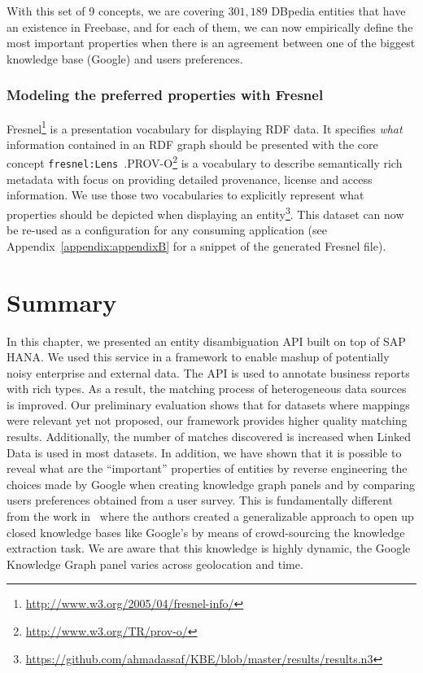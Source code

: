 With this set of 9 concepts, we are covering $301,189$ DBpedia entities that have an existence in Freebase, and for each of them, we can now empirically define the most important properties when there is an agreement between one of the biggest knowledge base (Google) and users preferences.

\subsubsection{Modeling the preferred properties with Fresnel}

Fresnel\footnote{\url{http://www.w3.org/2005/04/fresnel-info/}} is a presentation vocabulary for displaying RDF data. It specifies \textit{what} information contained in an RDF graph should be presented with the core concept \texttt{fresnel:Lens}~\cite{Pietriga:ISWC:06}.PROV-O\footnote{\url{http://www.w3.org/TR/prov-o/}} is a vocabulary to describe semantically rich metadata with focus on providing detailed provenance, license and access information.  We use those two vocabularies to explicitly represent what properties should be depicted when displaying an entity\footnote{\url{https://github.com/ahmadassaf/KBE/blob/master/results/results.n3}}. This dataset can now be re-used as a configuration for any consuming application (see Appendix~\ref{appendix:appendixB} for a snippet of the generated Fresnel file).


\section{Summary}

In this chapter, we presented an entity disambiguation API built on top of SAP HANA. We used this service in a framework to enable mashup of potentially noisy enterprise and external data. The API is used to annotate business reports with rich types. As a result, the matching process of heterogeneous data sources is improved. Our preliminary evaluation shows that for datasets where mappings were relevant yet not proposed, our framework provides higher quality matching results. Additionally, the number of matches discovered is increased when Linked Data is used in most datasets. In addition, we have shown that it is possible to reveal what are the ``important'' properties of entities by reverse engineering the choices made by Google when creating knowledge graph panels and by comparing  users preferences obtained from a user survey. This is fundamentally different from the work in~\cite{Steiner:IKEC:12} where the authors created a generalizable approach to open up closed knowledge bases like Google's by means of crowd-sourcing the knowledge extraction task. We are aware that this knowledge is highly dynamic, the Google Knowledge Graph panel varies across geolocation and time.
